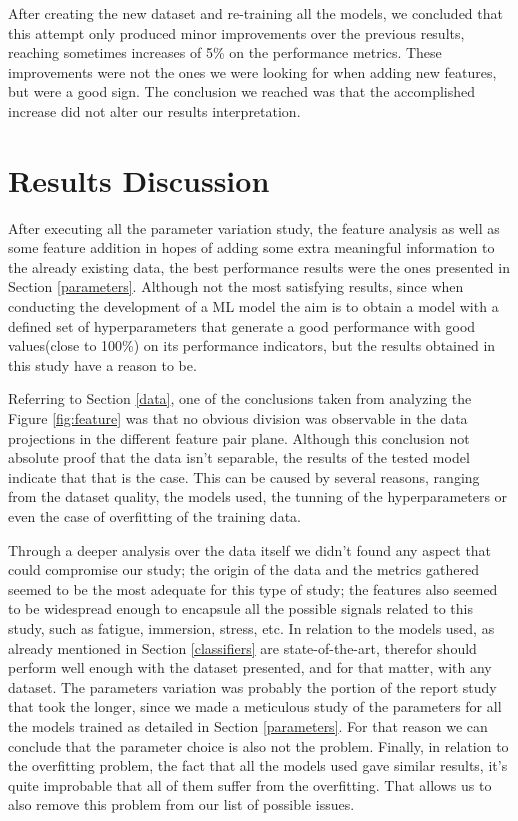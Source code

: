 \documentclass[extendedabs]{recpad2k}
\begin{document}
After creating the new dataset and re-training all the models, we concluded that this attempt only produced minor improvements over the previous results, 
reaching sometimes increases of 5\% on the performance metrics. 
These improvements were not the ones we were looking for when adding new features, but were a good sign. 
The conclusion we reached was that the accomplished increase did not alter our results interpretation.

\section{Results Discussion} %

After executing all the parameter variation study, the feature analysis as well as some feature addition in hopes of adding some extra meaningful information 
to the already existing data, the best performance results were the ones presented in Section \ref{parameters}.
Although not the most satisfying results, since when conducting the development of a ML model the aim is to obtain a model with a defined set of hyperparameters 
that generate a good performance with good values(close to 100\%) on its performance indicators, but the results obtained in this study have a reason to be.

Referring to Section \ref{data}, one of the conclusions taken from analyzing the Figure \ref{fig:feature} was that no obvious division was observable in the 
data projections in the different feature pair plane. Although this conclusion not absolute proof that the data isn't separable, the results of the tested 
model indicate that that is the case. This can be caused by several reasons, ranging from the dataset quality, the models used, the tunning of the 
hyperparameters or even the case of overfitting of the training data. 

Through a deeper analysis over the data itself we didn't found any aspect that could compromise our study; the origin of the data and the metrics gathered 
seemed to be the most adequate for this type of study; the features also seemed to be widespread enough to encapsule all the possible signals related to this 
study, such as fatigue, immersion, stress, etc. In relation to the models used, as already mentioned in Section \ref{classifiers} are state-of-the-art, 
therefor should perform well enough with the dataset presented, and for that matter, with any dataset. The parameters variation was probably the portion of 
the report study that took the longer, since we made a meticulous study of the parameters for all the models trained as detailed in Section \ref{parameters}. 
For that reason we can conclude that the parameter choice is also not the problem. Finally, in relation to the overfitting problem, the fact that all the models 
used gave similar results, it's quite improbable that all of them suffer from the overfitting. That allows us to also remove this problem from our list of 
possible issues.
\end{document}

